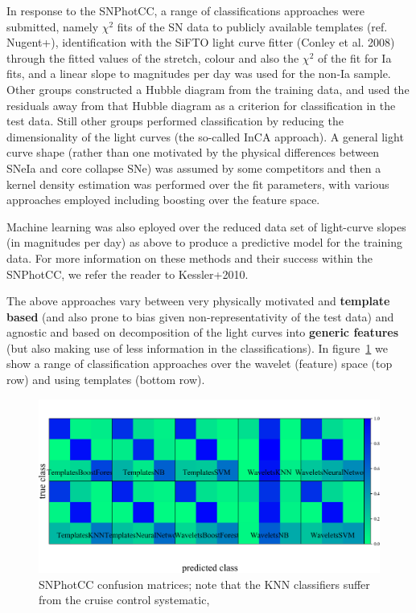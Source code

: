 In response to the SNPhotCC, a range of classifications approaches were submitted, namely $\chi^{2}$ fits of the SN data to publicly available templates (ref. Nugent+), identification with the SiFTO light curve fitter (Conley et al. 2008) through the fitted values of the stretch, colour and also the $\chi^{2}$ of the fit for Ia fits, and a linear slope to magnitudes per day was used for the non-Ia sample.
Other groups constructed a Hubble diagram from the training data, and used the residuals away from that Hubble diagram as a criterion for classification in the test data.
Still other groups performed classification by reducing the dimensionality of the light curves (the so-called InCA approach).
A general light curve shape (rather than one motivated by the physical differences between SNeIa and core collapse SNe) was assumed by some competitors and then a kernel density estimation was performed over the fit parameters, with various approaches employed including boosting over the feature space.

Machine learning was also eployed over the reduced data set of light-curve slopes (in magnitudes per day) as above to produce a predictive model for the training data.
For more information on these methods and their success within the SNPhotCC, we refer the reader to Kessler+2010.

The above approaches vary between very physically motivated and \textbf{template based} (and also prone to bias given non-representativity of the test data) and agnostic and based on decomposition of the light curves into \textbf{generic features} (but also making use of less information in the classifications).
In figure~\ref{fig:snphotcc_cm} we show a range of classification approaches over the wavelet (feature) space (top row) and using templates (bottom row).

\begin{figure}
	\begin{center}
    \includegraphics[width=\textwidth]{./fig/all_snphotcc_cm.png}
		\caption{SNPhotCC confusion matrices; note that the KNN classifiers suffer from the cruise control systematic, }
		\label{fig:snphotcc_cm}
	\end{center}
\end{figure}



